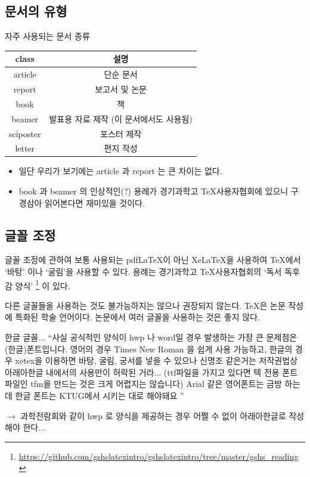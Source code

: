 \documentclass[12pt]{beamer}
\begin{document}
\subsection{문서의 유형}
\begin{frame}{자주 사용되는 문서 종류}
	\begin{tabular}{|c|c|}
		\hline
		class & 설명 \\
		\hline
		\hline
		article & 단순 문서 \\
		\hline
		report & 보고서 및 논문 \\
		\hline
		book & 책 \\
		\hline
		beamer & 발표용 자료 제작 (이 문서에서도 사용됨) \\
		\hline
		sciposter & 포스터 제작 \\
		\hline
		letter & 편지 작성 \\ 
		\hline
	\end{tabular}
	\begin{itemize}
		\item 일단 우리가 보기에는 article 과 report 는 큰 차이는 없다.
		\item book 과 beamer 의 인상적인(?) 용례가 경기과학고 \TeX 사용자협회에 있으니 구경삼아 읽어본다면 재미있을 것이다.
	\end{itemize}
\end{frame}
\subsection{글꼴 조정}
\begin{frame}{글꼴 조정에 관하여}
	보통 사용되는 pdf\LaTeX 이 아닌 Xe\LaTeX 을 사용하여 \TeX 에서 `바탕' 이나 `굴림'을 사용할 수 있다. 용례는 경기과학고 \TeX 사용자협회의 `독서 독후감 양식' \footnote{\url{https://github.com/gshslatexintro/gshslatexintro/tree/master/gshs_reading}} 이 있다. 
	\vspace{1cm}
	
	다른 글꼴들을 사용하는 것도 불가능하지는 않으나 권장되지 않는다. \TeX 은 논문 작성에 특화된 학술 언어이다. 논문에서 여러 글꼴을 사용하는 것은 좋지 않다.
\end{frame}
\begin{frame}{한글 글꼴...}
	``사실 공식적인 양식이 hwp 나 word일 경우 발생하는 가장 큰 문제점은 (한글)폰트입니다. 영어의 경우 Times New Roman 을 쉽게 사용 가능하고, 한글의 경우 xetex을 이용하면 바탕, 굴림, 궁서를 넣을 수 있으나 신명조 같은거는 저작권법상 아래아한글 내에서의 사용만이 허락된 거라... (ttf파일을 가지고 있다면 텍 전용 폰트 파일인 tfm을 만드는 것은 크게 어렵지는 않습니다)  Arial 같은 영어폰트는 금방 하는데 한글 폰트는 KTUG에서 시키는 대로 해야돼요 ''
	
	$ \rightarrow $ 과학전람회와 같이 hwp 로 양식을 제공하는 경우 어쩔 수 없이 아래아한글로 작성해야 한다...
\end{frame}
\end{document}
